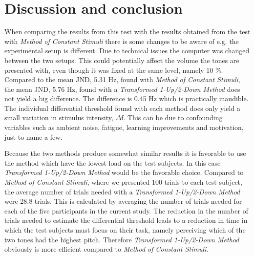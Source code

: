 \section*{Discussion and conclusion}
%
When comparing the results from this test with the results obtained from the test with \textit{Method of Constant Stimuli} there is some changes to be aware of e.g. the experimental setup is different. Due to technical issues the computer was changed between the two setups. This could potentially affect the volume the tones are presented with, even though it was fixed at the same level, namely 10 \%. \blankline
%
Compared to the mean JND, 5.31 Hz, found with \textit{Method of Constant Stimuli}, the mean JND, 5.76 Hz, found with a \textit{Transformed 1-Up/2-Down Method} does not yield a big difference. The difference is 0.45 Hz which is practically inaudible. The individual differential threshold found with each method does only yield a small variation in stimulus intensity, $\Delta$f. This can be due to confounding variables such as ambient noise, fatigue, learning improvements and motivation, just to name a few.  

Because the two methods produce somewhat similar results it is favorable to use the method which have the lowest load on the test subjects. In this case \textit{Transformed 1-Up/2-Down Method} would be the favorable choice. Compared to \textit{Method of Constant Stimuli}, where we presented 100 trials to each test subject, the average number of trials needed with a \textit{Transformed 1-Up/2-Down Method} were 28.8 trials. This is calculated by averaging the number of trials needed for each of the five participants in the current study. The reduction in the number of trials needed to estimate the differential threshold leads to a reduction in time in which the test subjects must focus on their task, namely perceiving which of the two tones had the highest pitch. Therefore \textit{Transformed 1-Up/2-Down Method} obviously is more efficient compared to \textit{Method of Constant Stimuli}.

